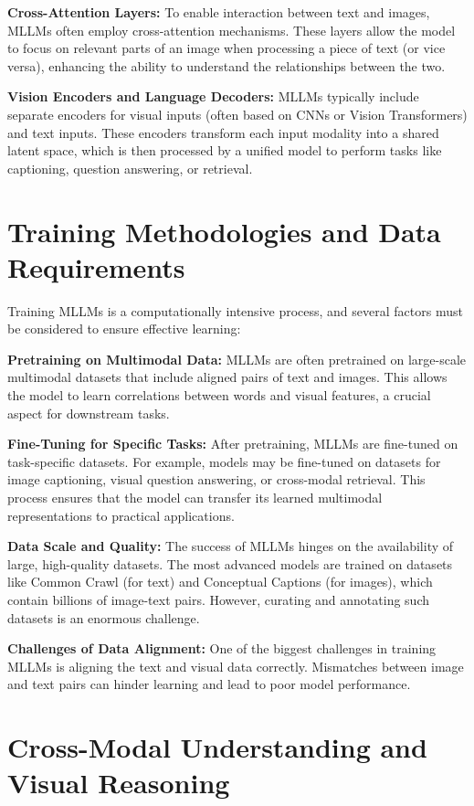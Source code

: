 \textbf{Cross-Attention Layers:} To enable interaction between text and images, MLLMs often employ cross-attention mechanisms. These layers allow the model to focus on relevant parts of an image when processing a piece of text (or vice versa), enhancing the ability to understand the relationships between the two.

\textbf{Vision Encoders and Language Decoders:} MLLMs typically include separate encoders for visual inputs (often based on CNNs or Vision Transformers) and text inputs. These encoders transform each input modality into a shared latent space, which is then processed by a unified model to perform tasks like captioning, question answering, or retrieval.

\section{Training Methodologies and Data Requirements}

Training MLLMs is a computationally intensive process, and several factors must be considered to ensure effective learning:

\textbf{Pretraining on Multimodal Data:} MLLMs are often pretrained on large-scale multimodal datasets that include aligned pairs of text and images. This allows the model to learn correlations between words and visual features, a crucial aspect for downstream tasks.

\textbf{Fine-Tuning for Specific Tasks:} After pretraining, MLLMs are fine-tuned on task-specific datasets. For example, models may be fine-tuned on datasets for image captioning, visual question answering, or cross-modal retrieval. This process ensures that the model can transfer its learned multimodal representations to practical applications.

\textbf{Data Scale and Quality:} The success of MLLMs hinges on the availability of large, high-quality datasets. The most advanced models are trained on datasets like Common Crawl (for text) and Conceptual Captions (for images), which contain billions of image-text pairs. However, curating and annotating such datasets is an enormous challenge.

\textbf{Challenges of Data Alignment:} One of the biggest challenges in training MLLMs is aligning the text and visual data correctly. Mismatches between image and text pairs can hinder learning and lead to poor model performance.

\section{Cross-Modal Understanding and Visual Reasoning}

